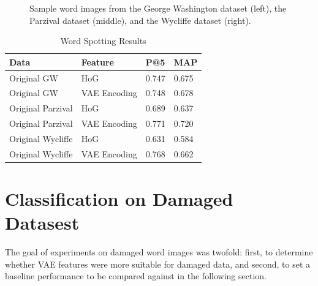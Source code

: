 \documentclass[final]{ukthesis}
\begin{document}
\begin{figure}[t]
\begin{center}
\end{center}
\caption{Sample word images from the George Washington dataset (left), the Parzival dataset (middle), and the Wycliffe dataset (right).}
\label{fig:word-samples}
\end{figure}

\begin{table}[h]
\centering
\begin{tabular}{llll}
\textbf{Data}  & \textbf{Feature} & \textbf{P@5} & \textbf{MAP} \\
\hline
Original GW    & HoG			& 0.747          & 0.675          \\
Original GW    & VAE Encoding 	& 0.748          & 0.678          \\
Original Parzival & HoG                     & 0.689          & 0.637          \\
Original Parzival & VAE Encoding 	& 0.771          & 0.720          \\
Original Wycliffe & HoG			& 0.631          & 0.584          \\
Original Wycliffe & VAE Encoding	& 0.768          & 0.662         
\end{tabular}
\caption{Word Spotting Results}
\label{tab:word-spotting}
\end{table}




%
%
\section{Classification on Damaged Datasest}
\label{sec:damaged-results}
The goal of experiments on damaged word images was twofold: first, to determine whether VAE features were more suitable for damaged data, and second, to set a baseline performance to be compared against in the following section.
\end{document}
